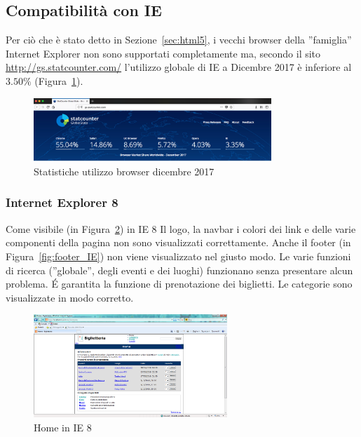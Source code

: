 \documentclass[10pt, a4paper]{article}
\begin{document}
\subsection{Compatibilità con IE} \marginpar{\dbend}
Per ciò che è stato detto in Sezione~\ref{sec:html5}, i vecchi browser della ''famiglia'' Internet Explorer non sono supportati completamente ma,
secondo il sito \url{http://gs.statcounter.com/} l'utilizzo globale di IE a Dicembre 2017 è inferiore al $3.50\%$ (Figura~\ref{fig:stat_brws}).

\begin{figure}[h!]
	\centering
	\includegraphics[width=0.80\textwidth]{Images/stat_brws.png}
	\caption{Statistiche utilizzo browser dicembre 2017}
	\label{fig:stat_brws}
\end{figure}

\subsubsection{Internet Explorer 8}
Come visibile (in Figura~\ref{fig:home_IE}) in IE 8 Il logo, la navbar i colori dei link e delle varie componenti
della pagina non sono visualizzati correttamente. Anche il footer (in Figura~\ref{fig:footer_IE}) non viene 
visualizzato nel giusto modo.
Le varie funzioni di ricerca (''globale'', degli eventi e dei luoghi)  funzionano senza presentare alcun problema.
É garantita la funzione di prenotazione dei biglietti. Le categorie sono visualizzate in modo corretto.

\begin{figure}[h!]
	\centering
	\includegraphics[width=0.65\textwidth]{Images/home_IE.png}
	\caption{Home in IE 8}
	\label{fig:home_IE}
\end{figure}
\end{document}
